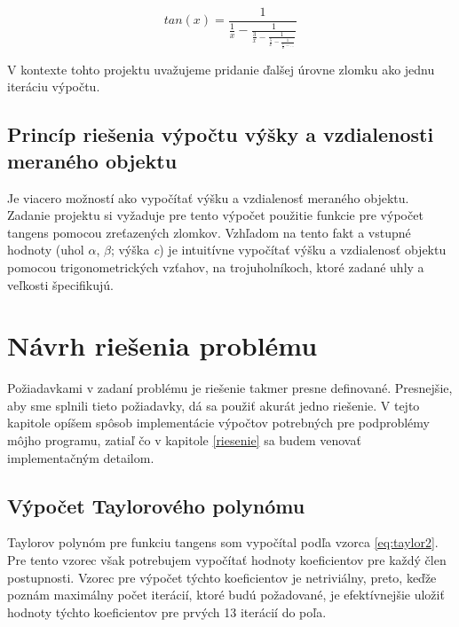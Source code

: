 \documentclass[12pt,a4paper,titlepage,final]{article}
\begin{document}
\begin{equation}\label{eq:cfrac2} 
tan(x) = \frac{1}{\frac{1}{x} - \frac{1}{\frac{3}{x} - \frac{1}{\frac{5}{x} - \frac{1}{\frac{7}{x} -...}}}}
\end{equation}

V kontexte tohto projektu uvažujeme pridanie ďalšej úrovne zlomku ako jednu iteráciu výpočtu.

\subsection{Princíp riešenia výpočtu výšky a vzdialenosti meraného objektu}

Je viacero možností ako vypočítať výšku a vzdialenosť meraného objektu. Zadanie projektu si vyžaduje pre tento výpočet použitie funkcie pre výpočet tangens pomocou zreťazených zlomkov. Vzhľadom na tento fakt a vstupné hodnoty (uhol $\alpha$, $\beta$; výška \textit{c}) je intuitívne vypočítať výšku a vzdialenosť objektu pomocou trigonometrických vzťahov, na trojuholníkoch, ktoré zadané uhly a veľkosti špecifikujú.

\section{Návrh riešenia problému} \label{navrh}

Požiadavkami v zadaní problému je riešenie takmer presne definované. Presnejšie, aby sme splnili tieto požiadavky, dá sa použiť akurát jedno riešenie. V tejto kapitole opíšem spôsob implementácie výpočtov potrebných pre podproblémy môjho programu, zatiaľ čo v kapitole \ref{riesenie} sa budem venovať implementačným detailom.

\subsection{Výpočet Taylorového polynómu}\label{impTaylor}

Taylorov polynóm pre funkciu tangens som vypočítal podľa vzorca \ref{eq:taylor2}. Pre tento vzorec však potrebujem vypočítať hodnoty koeficientov pre každý člen postupnosti. Vzorec pre výpočet týchto koeficientov je netriviálny, preto, keďže poznám maximálny počet iterácií, ktoré budú požadované, je efektívnejšie uložiť hodnoty týchto koeficientov pre prvých 13 iterácií do poľa. 
\end{document}
